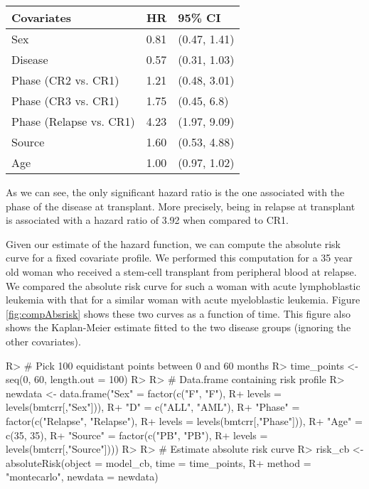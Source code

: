 \documentclass[article]{jss}
\begin{document}
\begin{CodeChunk}

\begin{tabular}{l|r|l}
\hline
Covariates & HR & 95\% CI\\
\hline
Sex & 0.81 & (0.47, 1.41)\\
\hline
Disease & 0.57 & (0.31, 1.03)\\
\hline
Phase (CR2 vs. CR1) & 1.21 & (0.48, 3.01)\\
\hline
Phase (CR3 vs. CR1) & 1.75 & (0.45, 6.8)\\
\hline
Phase (Relapse vs. CR1) & 4.23 & (1.97, 9.09)\\
\hline
Source & 1.60 & (0.53, 4.88)\\
\hline
Age & 1.00 & (0.97, 1.02)\\
\hline
\end{tabular}

\end{CodeChunk}

As we can see, the only significant hazard ratio is the one associated
with the phase of the disease at transplant. More precisely, being in
relapse at transplant is associated with a hazard ratio of 3.92 when
compared to CR1.

Given our estimate of the hazard function, we can compute the absolute
risk curve for a fixed covariate profile. We performed this computation
for a 35 year old woman who received a stem-cell transplant from
peripheral blood at relapse. We compared the absolute risk curve for
such a woman with acute lymphoblastic leukemia with that for a similar
woman with acute myeloblastic leukemia. Figure \ref{fig:compAbsrisk}
shows these two curves as a function of time. This figure also shows the
Kaplan-Meier estimate fitted to the two disease groups (ignoring the
other covariates).

\begin{CodeChunk}

\begin{CodeInput}
R> # Pick 100 equidistant points between 0 and 60 months
R> time_points <- seq(0, 60, length.out = 100)
R> 
R> # Data.frame containing risk profile
R> newdata <- data.frame("Sex" = factor(c("F", "F"), 
R+                                      levels = levels(bmtcrr[,"Sex"])),
R+                       "D" = c("ALL", "AML"),
R+                       "Phase" = factor(c("Relapse", "Relapse"), 
R+                                        levels = levels(bmtcrr[,"Phase"])),
R+                       "Age" = c(35, 35),
R+                       "Source" = factor(c("PB", "PB"), 
R+                                         levels = levels(bmtcrr[,"Source"])))
R> 
R> # Estimate absolute risk curve
R> risk_cb <- absoluteRisk(object = model_cb, time = time_points,
R+                         method = "montecarlo", newdata = newdata)
\end{CodeInput}
\end{CodeChunk}
\end{document}
